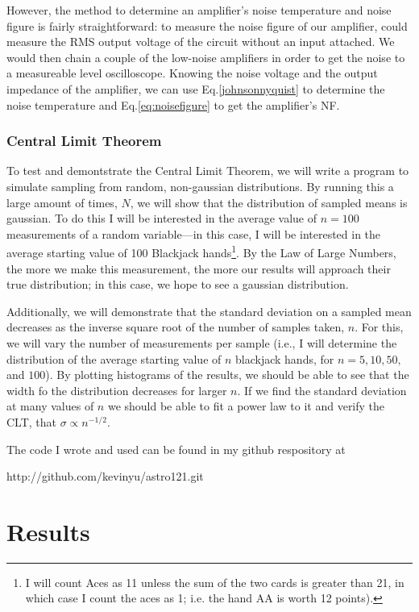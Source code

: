 \documentclass[12pt]{article}
\begin{document}
However, the method to determine an amplifier's noise temperature and noise figure is fairly straightforward: to measure the noise figure of our amplifier, could measure the RMS output voltage of the circuit without an input attached. We would then chain a couple of the low-noise amplifiers in order to get the noise to a measureable level oscilloscope. Knowing the noise voltage and the output impedance of the amplifier, we can use Eq.\ref{johnsonnyquist} to determine the noise temperature and Eq.\ref{eq:noisefigure} to get the amplifier's NF.

\subsubsection*{Central Limit Theorem}
To test and demontstrate the Central Limit Theorem, we will write a program to simulate sampling from random, non-gaussian distributions. By running this a large amount of times, $N$, we will show that the distribution of sampled means is gaussian. To do this I will be interested in the average value of $n=100$ measurements of a random variable---in this case, I will be interested in the average starting value of 100 Blackjack hands\footnote{I will count Aces as 11 unless the sum of the two cards is greater than 21, in which case I count the aces as 1; i.e. the hand AA is worth 12 points).}. By the Law of Large Numbers, the more we make this measurement, the more our results will approach their true distribution; in this case, we hope to see a gaussian distribution.

Additionally, we will demonstrate that the standard deviation on a sampled mean decreases as the inverse square root of the number of samples taken, $n$. For this, we will vary the number of measurements per sample (i.e., I will determine the distribution of the average starting value of $n$ blackjack hands, for $n=5,10,50,$ and $100$). By plotting histograms of the results, we should be able to see that the width fo the distribution decreases for larger $n$. If we find the standard deviation at many values of $n$ we should be able to fit a power law to it and verify the CLT, that $\sigma \propto n^{-1/2}$.

The code I wrote and used can be found in my github respository at

 http://github.com/kevinyu/astro121.git

\section*{Results}
\end{document}
